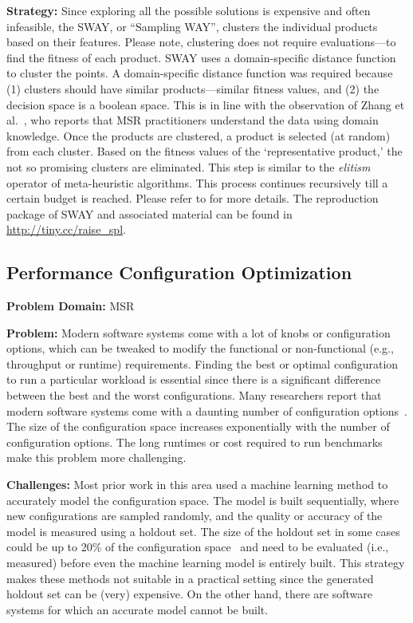 \documentclass[sigconf]{acmart}
\begin{document}
\noindent\textbf{Strategy:} Since exploring all the possible solutions is expensive and often infeasible, the SWAY, or ``Sampling WAY'', clusters the individual products based on their features. Please note, clustering does not require evaluations---to find the fitness of each product. SWAY uses a domain-specific distance function to cluster the points. A domain-specific distance function was required because (1) clusters should have similar products---similar fitness values, and (2) the decision space is a boolean space. This is in line with the observation of Zhang et al.~\cite{zhang2013software}, who reports that MSR practitioners understand the data using domain knowledge. Once the products are clustered, a product is selected (at random) from each cluster. Based on the fitness values of the `representative product,' the not so promising clusters are eliminated. This step is similar to the \textit{elitism} operator of meta-heuristic algorithms. This process continues recursively till a certain budget is reached. Please refer to \cite{nair2016accidental, chen2017beyond, chen2017sampling} for more details. The reproduction package of SWAY and associated material can be found in \url{http://tiny.cc/raise_spl}.

    \subsection{Performance Configuration Optimization}
\noindent\textbf{Problem Domain: } MSR

\noindent\textbf{Problem: } Modern software systems come with a lot of knobs or configuration options, which can be tweaked to modify the functional or non-functional (e.g., throughput or runtime) requirements. Finding the best or optimal configuration to run a particular workload is essential since there is a significant difference between the best and the worst configurations. Many researchers report that modern software systems come with a daunting number of configuration options~\cite{xu2015hey}. The size of the configuration space increases exponentially with the number of configuration options. The long runtimes or cost required to run benchmarks make this problem more challenging.

\noindent\textbf{Challenges: } Most prior work in this area used a machine learning method to accurately model the
configuration space. 
The model is built sequentially, where new configurations are sampled randomly, and the quality or accuracy of the model is measured using a holdout set. The size of the holdout set in some cases could be up to 20\% of the configuration space~\cite{nair2017using} and need to be evaluated (i.e., measured) before even the machine learning model is entirely built. This strategy makes these methods not suitable in a practical setting since the generated holdout set can be (very) expensive. On the other hand, there are software systems for which an accurate model cannot be built. 
\end{document}
